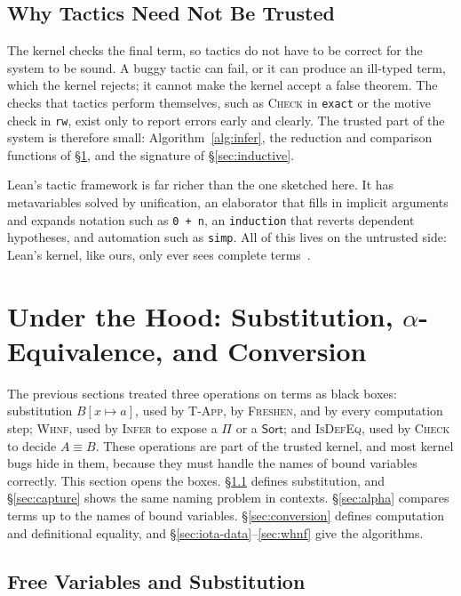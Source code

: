 \documentclass[acmsmall,screen,nonacm]{acmart}
\newcommand{\subst}[3]{#1[#2 \mapsto #3]}
\newcommand{\conv}{\equiv}
\begin{document}
\subsection{Why Tactics Need Not Be Trusted}

The kernel checks the final term, so tactics do not have to be correct for the system to be sound.
A buggy tactic can fail, or it can produce an ill-typed term, which the kernel rejects; it cannot make the kernel accept a false theorem.
The checks that tactics perform themselves, such as \textsc{Check} in \texttt{exact} or the motive check in \texttt{rw}, exist only to report errors early and clearly.
The trusted part of the system is therefore small: Algorithm~\ref{alg:infer}, the reduction and comparison functions of \S\ref{sec:machinery}, and the signature of \S\ref{sec:inductive}.

Lean's tactic framework is far richer than the one sketched here.
It has metavariables solved by unification, an elaborator that fills in implicit arguments and expands notation such as \texttt{0 + n},
an \texttt{induction} that reverts dependent hypotheses, and automation such as \texttt{simp}.
All of this lives on the untrusted side: Lean's kernel, like ours, only ever sees complete terms~\cite{moura2021lean4}.


\section{Under the Hood: Substitution, $\alpha$-Equivalence, and Conversion}
\label{sec:machinery}

The previous sections treated three operations on terms as black boxes:
substitution $\subst{B}{x}{a}$, used by \textsc{T-App}, by \textsc{Freshen}, and by every computation step;
\textsc{Whnf}, used by \textsc{Infer} to expose a $\Pi$ or a $\mathsf{Sort}$;
and \textsc{IsDefEq}, used by \textsc{Check} to decide $A \conv B$.
These operations are part of the trusted kernel, and most kernel bugs hide in them, because they must handle the names of bound variables correctly.
This section opens the boxes.
\S\ref{sec:subst} defines substitution, and \S\ref{sec:capture} shows the same naming problem in contexts.
\S\ref{sec:alpha} compares terms up to the names of bound variables.
\S\ref{sec:conversion} defines computation and definitional equality, and \S\ref{sec:iota-data}--\ref{sec:whnf} give the algorithms.

\subsection{Free Variables and Substitution}
\label{sec:subst}
\end{document}
